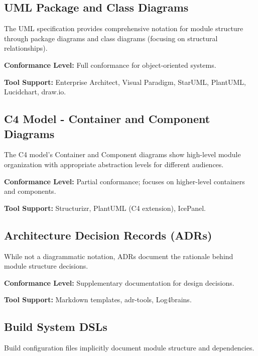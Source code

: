 \documentclass[11pt,letterpaper]{article}
\begin{document}
\subsection{UML Package and Class Diagrams}

The UML specification provides comprehensive notation for module structure through package diagrams and class diagrams (focusing on structural relationships).

\textbf{Conformance Level:} Full conformance for object-oriented systems.

\textbf{Tool Support:} Enterprise Architect, Visual Paradigm, StarUML, PlantUML, Lucidchart, draw.io.

\subsection{C4 Model - Container and Component Diagrams}

The C4 model's Container and Component diagrams show high-level module organization with appropriate abstraction levels for different audiences.

\textbf{Conformance Level:} Partial conformance; focuses on higher-level containers and components.

\textbf{Tool Support:} Structurizr, PlantUML (C4 extension), IcePanel.

\subsection{Architecture Decision Records (ADRs)}

While not a diagrammatic notation, ADRs document the rationale behind module structure decisions.

\textbf{Conformance Level:} Supplementary documentation for design decisions.

\textbf{Tool Support:} Markdown templates, adr-tools, Log4brains.

\subsection{Build System DSLs}

Build configuration files implicitly document module structure and dependencies.
\end{document}
